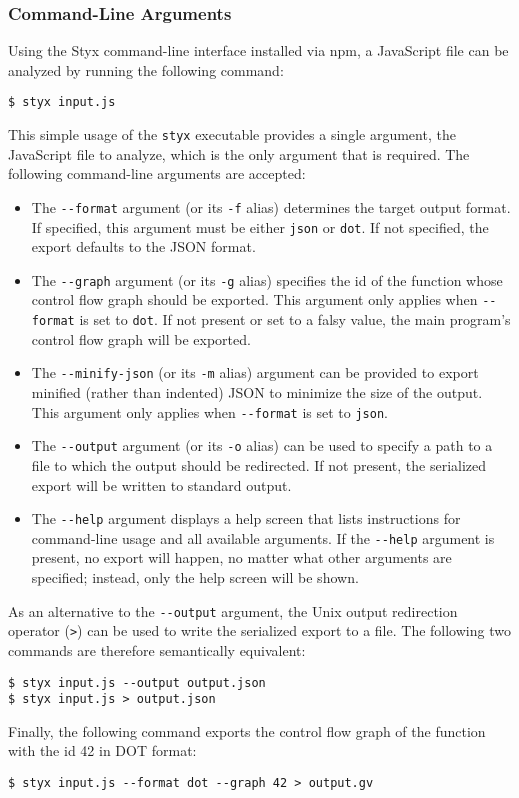 \subsubsection{Command-Line Arguments}
\label{sec:styx-cli-args}

Using the Styx command-line interface installed via npm, a JavaScript file can be analyzed by running the following command:

\begin{verbatim}
$ styx input.js
\end{verbatim}

This simple usage of the \texttt{styx} executable provides a single argument, the JavaScript file to analyze, which is the only argument that is required. The following command-line arguments are accepted:

\begin{itemize}
  \item The \texttt{-{}-format} argument (or its \texttt{-f} alias) determines the target output format. If specified, this argument must be either \texttt{json} or \texttt{dot}. If not specified, the export defaults to the JSON format.
  \item The \texttt{-{}-graph} argument (or its \texttt{-g} alias) specifies the id of the function whose control flow graph should be exported. This argument only applies when \texttt{-{}-format} is set to \texttt{dot}. If not present or set to a falsy value, the main program's control flow graph will be exported.
  \item The \texttt{-{}-minify-json} (or its \texttt{-m} alias) argument can be provided to export minified (rather than indented) JSON to minimize the size of the output. This argument only applies when \texttt{-{}-format} is set to \texttt{json}.
  \item The \texttt{-{}-output} argument (or its \texttt{-o} alias) can be used to specify a path to a file to which the output should be redirected. If not present, the serialized export will be written to standard output.
  \item The \texttt{-{}-help} argument displays a help screen that lists instructions for command-line usage and all available arguments. If the \texttt{-{}-help} argument is present, no export will happen, no matter what other arguments are specified; instead, only the help screen will be shown.
\end{itemize}

As an alternative to the \texttt{-{}-output} argument, the Unix output redirection operator (\texttt{\textgreater}) can be used to write the serialized export to a file. The following two commands are therefore semantically equivalent:

\begin{verbatim}
$ styx input.js --output output.json
$ styx input.js > output.json
\end{verbatim}

Finally, the following command exports the control flow graph of the function with the id 42 in DOT format:

\begin{verbatim}
$ styx input.js --format dot --graph 42 > output.gv
\end{verbatim}
